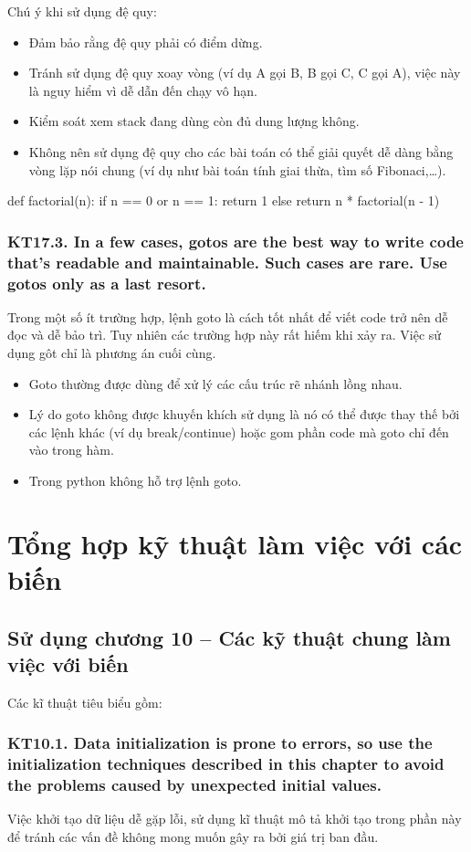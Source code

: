 \documentclass[12pt]{report}
\begin{document}
\noindent Chú ý khi sử dụng đệ quy:
\begin{itemize}
	\item Đảm bảo rằng đệ quy phải có điểm dừng.
	\item Tránh sử dụng đệ quy xoay vòng (ví dụ A gọi B, B gọi C, C gọi A), việc này là nguy hiểm vì dễ dẫn đến chạy vô hạn.
	\item Kiểm soát xem stack đang dùng còn đủ dung lượng không.
	\item Không nên sử dụng đệ quy cho các bài toán có thể giải quyết dễ dàng bằng vòng lặp nói chung (ví dụ như bài toán tính giai thừa, tìm số Fibonaci,…).
\end{itemize}
\begin{python}
def factorial(n):
	if n == 0 or n == 1:
		return 1
	else 
		return n * factorial(n - 1)
\end{python}


\subsubsection{KT17.3. In a few cases, gotos are the best way to write code that's readable and maintainable. Such cases are rare. Use gotos only as a last resort.}
Trong một số ít trường hợp, lệnh goto là cách tốt nhất để viết code trở nên dễ đọc và dễ bảo trì. Tuy nhiên các trường hợp này rất hiếm khi xảy ra. Việc sử dụng gôt chỉ là phương án cuối cùng.
\begin{itemize}
	\item Goto thường được dùng để xử lý các cấu trúc rẽ nhánh lồng nhau.
	\item Lý do goto không được khuyến khích sử dụng là nó có thể được thay thế bởi các lệnh khác (ví dụ break/continue) hoặc gom phần code mà goto chỉ đến vào trong hàm.
	\item Trong python không hỗ trợ lệnh goto.
\end{itemize}


\section{\bfseries Tổng hợp kỹ thuật làm việc với các biến}

\subsection{Sử dụng chương 10 -- Các kỹ thuật chung làm việc với biến}
\noindent Các kĩ thuật tiêu biểu gồm:
\subsubsection{KT10.1. Data initialization is prone to errors, so use the initialization techniques described in this chapter to avoid the problems caused by unexpected initial values.}
Việc khởi tạo dữ liệu dễ gặp lỗi, sử dụng kĩ thuật mô tả khởi tạo trong phần này để tránh các vấn đề
không mong muốn gây ra bởi giá trị ban đầu.
\vspace*{3mm}
\end{document}
